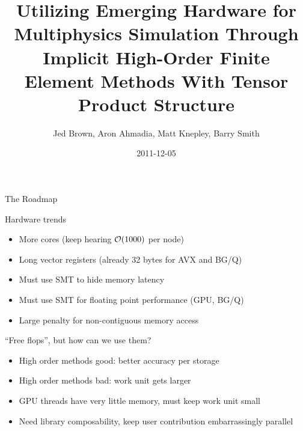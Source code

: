 \documentclass{beamer}
\title{Utilizing Emerging Hardware for Multiphysics Simulation Through Implicit High-Order Finite Element Methods With Tensor Product Structure}
\author{Jed Brown\inst{1}, Aron Ahmadia\inst{2}, Matt Knepley\inst{3}, Barry Smith\inst{1}}
\institute
{
  \inst{1}{Mathematics and Computer Science Division, Argonne National Laboratory} \\
  \inst{2}{King Abdullah University of Science and Technology} \\
  \inst{3}{Computation Institute, University of Chicago}
}
\date{2011-12-05}
\begin{document}
\lstset{language=C}
\normalem

\begin{frame}
  \titlepage
\end{frame}

\begin{frame}{The Roadmap}
  \begin{block}{Hardware trends}
    \begin{itemize}
    \item More cores (keep hearing $\mathcal{O}(1000)$ per node)
    \item Long vector registers (already 32 bytes for AVX and BG/Q)
    \item Must use SMT to hide memory latency
    \item Must use SMT for floating point performance (GPU, BG/Q)
    \item Large penalty for non-contiguous memory access
    \end{itemize}
  \end{block}
  \begin{block}{``Free flops'', but how can we use them?}
    \begin{itemize}
    \item High order methods good: better accuracy per storage
    \item High order methods bad: work unit gets larger
    \item GPU threads have very little memory, must keep work unit small
    \item Need library composability, keep user contribution embarrassingly parallel
    \end{itemize}
  \end{block}
\end{frame}
\end{document}
